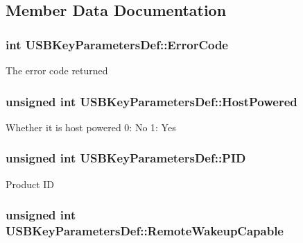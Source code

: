 \subsection{\-Member \-Data \-Documentation}
\hypertarget{struct_u_s_b_key_parameters_def_aaaf11b677e036ff4847cc42bf891e786}{
\subsubsection[{\-Error\-Code}]{\setlength{\rightskip}{0pt plus 5cm}int {\bf \-U\-S\-B\-Key\-Parameters\-Def\-::\-Error\-Code}}}\label{struct_u_s_b_key_parameters_def_aaaf11b677e036ff4847cc42bf891e786}
\-The error code returned \hypertarget{struct_u_s_b_key_parameters_def_a49d44f9a0d7bd72369090932dee48323}{
\subsubsection[{\-Host\-Powered}]{\setlength{\rightskip}{0pt plus 5cm}unsigned int {\bf \-U\-S\-B\-Key\-Parameters\-Def\-::\-Host\-Powered}}}\label{struct_u_s_b_key_parameters_def_a49d44f9a0d7bd72369090932dee48323}
\-Whether it is host powered 0\-: \-No 1\-: \-Yes \hypertarget{struct_u_s_b_key_parameters_def_af2a7b529b80b82c0933cc8ce38723e1e}{
\subsubsection[{\-P\-I\-D}]{\setlength{\rightskip}{0pt plus 5cm}unsigned int {\bf \-U\-S\-B\-Key\-Parameters\-Def\-::\-P\-I\-D}}}\label{struct_u_s_b_key_parameters_def_af2a7b529b80b82c0933cc8ce38723e1e}
\-Product \-I\-D \hypertarget{struct_u_s_b_key_parameters_def_ab03b4a5fd9b6f7c1e8b5b10a02a2496d}{
\subsubsection[{\-Remote\-Wakeup\-Capable}]{\setlength{\rightskip}{0pt plus 5cm}unsigned int {\bf \-U\-S\-B\-Key\-Parameters\-Def\-::\-Remote\-Wakeup\-Capable}}}\label{struct_u_s_b_key_parameters_def_ab03b4a5fd9b6f7c1e8b5b10a02a2496d}
